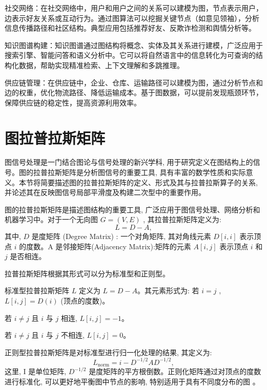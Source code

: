 社交网络：在社交网络中，用户和用户之间的关系可以建模为图，节点表示用户，边表示好友关系或互动行为。通过图算法可以挖掘关键节点（如意见领袖），分析信息传播路径和社区结构。典型应用包括推荐好友、反欺诈检测和舆情分析等。

知识图谱构建：知识图谱通过图结构将概念、实体及其关系进行建模，广泛应用于搜索引擎、智能问答和语义分析中。它可以将自然语言中的信息转化为可查询的结构化数据，帮助实现精准检索、上下文理解和多跳推理。

供应链管理：在供应链中，企业、仓库、运输路径可以建模为图，通过分析节点和边的权重，优化物流路径、降低运输成本。基于图数据，可以提前发现瓶颈环节，保障供应链的稳定性，提高资源利用效率。


\section{图拉普拉斯矩阵}

图信号处理是一门结合图论与信号处理的新兴学科, 用于研究定义在图结构上的信号。图的拉普拉斯矩阵是分析图信号的重要工具, 具有丰富的数学性质和实际意义。本节将简要描述图的拉普拉斯矩阵的定义、形式及其与拉普拉斯算子的关系, 并论述其在反映图信号局部平滑度及构建二次型中的重要作用。

图的拉普拉斯矩阵是描述图结构的重要工具, 广泛应用于图信号处理、网络分析和机器学习中。对于一个无向图 \(G = \left( {V, E}\right)\) , 其拉普拉斯矩阵定义为:
\begin{equation}
L = D - {A}, 
\end{equation}
其中, \(D\) 是度矩阵 (Degree Matrix) : 一个对角矩阵, 其对角线元素 \(D\left\lbrack  {i, i}\right\rbrack\) 表示顶点 \(i\) 的度数。A 是邻接矩阵(Adjacency Matrix):矩阵的元素 \({A}\left\lbrack  {i, j}\right\rbrack\) 表示顶点 \(i\) 和 \(j\) 是否相连。

拉普拉斯矩阵根据其形式可以分为标准型和正则型。

标准型拉普拉斯矩阵 \(L\) 定义为 \(L = D - {A}\)。其元素形式为: 若 \(i = j\) , \(L\left\lbrack  {i, j}\right\rbrack   = D(i)\) (顶点的度数)。

若 \(i \neq  j\) 且 \(i\) 与 \(j\) 相连, \(L\left\lbrack  {i, j}\right\rbrack   =  - 1\)。

若 \(i \neq  j\) 且 \(i\) 与 \(j\) 不相连, \(L\left\lbrack  {i, j}\right\rbrack   = 0\)。

正则型拉普拉斯矩阵是对标准型进行归一化处理的结果, 其定义为:
\begin{equation}
L_\mathrm{norm} = i - {D}^{-1/2}{A}{D}^{-1/2}, 
\end{equation}
这里, I 是单位矩阵, \({D}^{-1/2}\) 是度矩阵的平方根倒数。正则化矩阵通过对顶点的度数进行标准化, 可以更好地平衡图中节点的影响, 特别适用于具有不同度分布的图 \parencite{1997_Chung_Spectral_Graph_Theory}。

